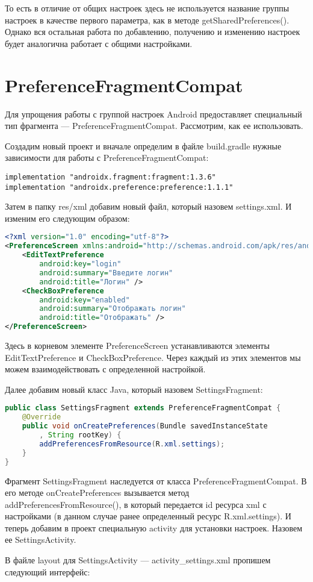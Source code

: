 То есть в отличие от общих настроек здесь не используется название группы
настроек в качестве первого параметра, как в методе getSharedPreferences().
Однако вся остальная работа по добавлению, получению и изменению
настроек будет аналогична работает с общими настройками.

\section{PreferenceFragmentCompat}
Для упрощения работы с группой настроек Android предоставляет
специальный тип фрагмента --- PreferenceFragmentCompat. Рассмотрим, как ее
использовать.\par
Создадим новый проект и вначале определим в файле build.gradle нужные
зависимости для работы с PreferenceFragmentCompat:

\begin{verbatim}
implementation "androidx.fragment:fragment:1.3.6"
implementation "androidx.preference:preference:1.1.1"
\end{verbatim}

Затем в папку res/xml добавим новый файл, который назовем settings.xml. И
изменим его следующим образом:

\begin{lstlisting}[language=XML
	, label=lst:
	]
<?xml version="1.0" encoding="utf-8"?>
<PreferenceScreen xmlns:android="http://schemas.android.com/apk/res/android">
    <EditTextPreference
        android:key="login"
        android:summary="Введите логин"
        android:title="Логин" />
    <CheckBoxPreference
        android:key="enabled"
        android:summary="Отображать логин"
        android:title="Отображать" />
</PreferenceScreen>
\end{lstlisting}

Здесь в корневом элементе PreferenceScreen устанавливаются элементы
EditTextPreference и CheckBoxPreference. Через каждый из этих элементов
мы можем взаимодействовать с определенной настройкой.\par
Далее добавим новый класс Java, который назовем SettingsFragment:

\begin{lstlisting}[language=Java
	, label=lst:
	]
public class SettingsFragment extends PreferenceFragmentCompat {
	@Override
	public void onCreatePreferences(Bundle savedInstanceState
		, String rootKey) {
		addPreferencesFromResource(R.xml.settings);
	}
}
\end{lstlisting}

Фрагмент SettingsFragment наследуется от класса
PreferenceFragmentCompat. В его методе onCreatePreferences вызывается
метод addPreferencesFromResource(), в который передается id ресурса xml с
настройками (в данном случае ранее определенный ресурс R.xml.settings).
И теперь добавим в проект специальную activity для установки настроек.
Назовем ее SettingsActivity.\par
В файле layout для SettingsActivity --- activity\_settings.xml пропишем
следующий интерфейс:

